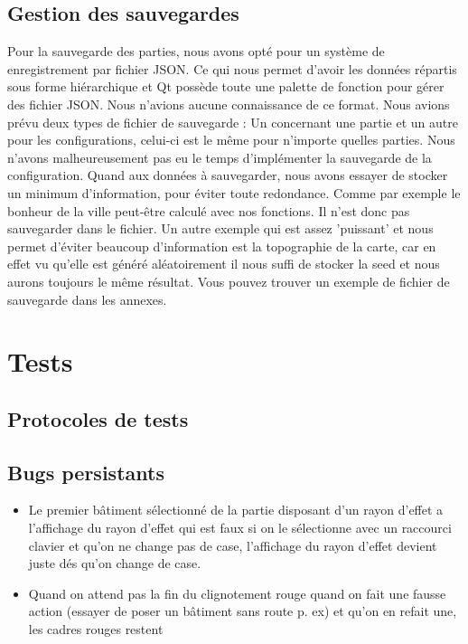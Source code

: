 \documentclass[a4paper,10pt,openany,oneside]{report}
\begin{document}
\subsection{Gestion des sauvegardes}
Pour la sauvegarde des parties, nous avons opté pour un système de enregistrement par fichier JSON. Ce qui nous permet d'avoir les données répartis sous forme hiérarchique et Qt possède toute une palette de fonction pour gérer des fichier JSON. Nous n'avions aucune connaissance de ce format.
\newline
Nous avions prévu deux types de fichier de sauvegarde : Un concernant une partie et un autre pour les configurations, celui-ci est le même pour n'importe quelles parties. Nous n'avons malheureusement pas eu le temps d'implémenter la sauvegarde de la configuration.
\newline
Quand aux données à sauvegarder, nous avons essayer de stocker un minimum d'information, pour éviter toute redondance. Comme par exemple le bonheur de la ville peut-être calculé avec nos fonctions. Il n'est donc pas sauvegarder dans le fichier. Un autre exemple qui est assez 'puissant' et nous permet d'éviter beaucoup d'information est la topographie de la carte, car en effet vu qu'elle est généré aléatoirement il nous suffi de stocker la seed et nous aurons toujours le même résultat.
\newline
Vous pouvez trouver un exemple de fichier de sauvegarde dans les annexes.


\section{Tests}
\thispagestyle{headings}
\subsection{Protocoles de tests}
\subsection{Bugs persistants}
\begin{itemize}
\item Le premier bâtiment sélectionné de la partie disposant d'un rayon d'effet a l'affichage du rayon d'effet qui est faux si on le sélectionne avec un raccourci clavier et qu'on ne change pas de case, l'affichage du rayon d'effet devient juste dés qu'on change de case.
\item Quand on attend pas la fin du clignotement rouge quand on fait une fausse action (essayer de poser un bâtiment sans route p. ex) et qu'on en refait une, les cadres rouges restent
\end{itemize}
\end{document}
